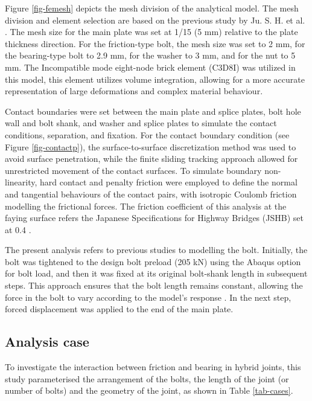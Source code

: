 Figure \ref{fig-femesh} depicts the mesh division of the analytical model. The mesh division and element selection are based on the previous study by Ju. S. H. et al. \cite{ju2004-boltfea}. The mesh size for the main plate was set at 1/15 (5 mm) relative to the plate thickness direction. For the friction-type bolt, the mesh size was set to 2 mm, for the bearing-type bolt to 2.9 mm, for the washer to 3 mm, and for the nut to 5 mm. The Incompatible mode eight-node brick element (C3D8I) was utilized in this model, this element utilizes volume integration, allowing for a more accurate representation of large deformations and complex material behaviour.

Contact boundaries were set between the main plate and splice plates, bolt hole wall and bolt shank, and washer and splice plates to simulate the contact conditions, separation, and fixation. For the contact boundary condition (see Figure \ref{fig-contactp}), the surface-to-surface discretization method was used to avoid surface penetration, while the finite sliding tracking approach allowed for unrestricted movement of the contact surfaces. To simulate boundary non-linearity, hard contact and penalty friction were employed to define the normal and tangential behaviours of the contact pairs, with isotropic Coulomb friction modelling the frictional forces. The friction coefficient of this analysis at the faying surface refers the Japanese Specifications for Highway Bridges (JSHB) set at 0.4 \cite{douji2017,shishin2009}. 

The present analysis refers to previous studies \cite{Kim2007,hung1996,Shimozato2008ExperrimentalModel} to modelling the bolt. Initially, the bolt was tightened to the design bolt preload (205 kN) using the Abaqus option for bolt load, and then it was fixed at its original bolt-shank length in subsequent steps. This approach ensures that the bolt length remains constant, allowing the force in the bolt to vary according to the model's response \cite{Smith2020}. In the next step, forced displacement was applied to the end of the main plate.

\subsection{Analysis case}
To investigate the interaction between friction and bearing in hybrid joints, this study parameterised the arrangement of the bolts, the length of the joint (or number of bolts) and the geometry of the joint, as shown in Table \ref{tab-cases}.


